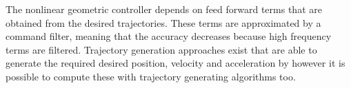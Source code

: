 


The nonlinear geometric controller depends on feed forward terms that are obtained from the desired trajectories. These terms are approximated by a command filter, meaning that the accuracy decreases because high frequency terms are filtered.
Trajectory generation approaches exist that are able to generate the required desired position, velocity and acceleration by 
however it is possible to compute these with trajectory generating algorithms too.
